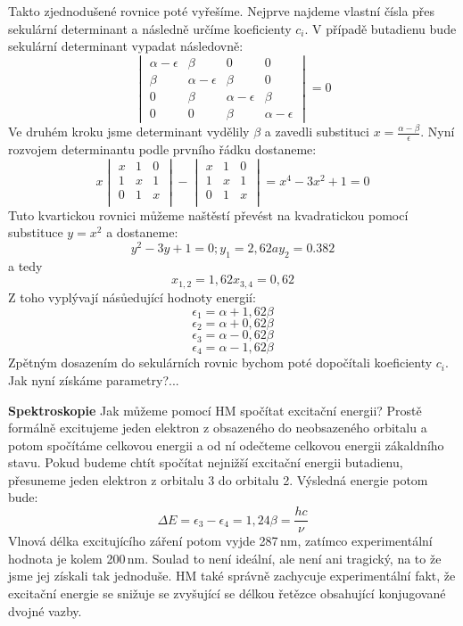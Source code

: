 Takto zjednodušené rovnice poté vyřešíme. Nejprve najdeme vlastní čísla přes sekulární determinant a následně určíme koeficienty $c_i$. V případě butadienu bude sekulární determinant vypadat následovně:
\begin{equation}
\begin{vmatrix}
\alpha-\epsilon & \beta & 0 & 0  \\
\beta &\alpha-\epsilon & \beta & 0  \\
0 &\beta &\alpha-\epsilon & \beta  \\
0 & 0 & \beta &\alpha-\epsilon  
\end{vmatrix}
= 0
\end{equation}
Ve druhém kroku jsme determinant vydělily $\beta$ a zavedli substituci $x=\frac{\alpha-\beta}{\epsilon}$.
Nyní rozvojem determinantu podle prvního řádku dostaneme:
\begin{equation}
x
\begin{vmatrix}
x & 1 & 0 \\
1 & x & 1 \\
0 & 1 & x \\
\end{vmatrix}
-
\begin{vmatrix}
x & 1 & 0 \\
1 & x & 1 \\
0 & 1 & x \\
\end{vmatrix}
=x^4-3x^2+1=0
\end{equation}
Tuto kvartickou rovnici můžeme naštěstí převést na kvadratickou pomocí substituce $y=x^2$ a dostaneme:
\begin{equation}
y^2-3y+1=0; y_1=2,62 a y_2=0.382
\end{equation}
a tedy
\begin{equation}
x_{1,2}=1,62
x_{3,4}=0,62
\end{equation}
Z toho vyplývají násůedující hodnoty energií:
$$ \epsilon_1 = \alpha+1,62\beta $$
$$ \epsilon_2 = \alpha+0,62\beta $$
$$ \epsilon_3 = \alpha-0,62\beta $$
$$ \epsilon_4 = \alpha-1,62\beta $$
Zpětným dosazením do sekulárních rovnic bychom poté dopočítali koeficienty $c_i$.
Jak nyní získáme parametry?...

\textbf{Spektroskopie}
Jak můžeme pomocí HM spočítat excitační energii? Prostě formálně excitujeme jeden elektron z obsazeného do neobsazeného orbitalu a potom spočítáme celkovou energii a od ní odečteme celkovou energii zákaldního stavu. Pokud budeme chtít spočítat nejnižší excitační energii butadienu, přesuneme jeden elektron z orbitalu 3 do orbitalu 2. Výsledná energie potom bude:
$$
\Delta E = \epsilon_3-\epsilon_4 = 1,24 \beta = \frac{hc}{\nu} 
$$
Vlnová délka excitujícího záření potom vyjde 287\,nm, zatímco experimentální hodnota je kolem 200\,nm.
Soulad to není ideální, ale není ani tragický, na to že jsme jej získali tak jednoduše. HM také správně zachycuje experimentální fakt, že excitační energie se snižuje se zvyšující se délkou řetězce obsahující konjugované dvojné vazby.


